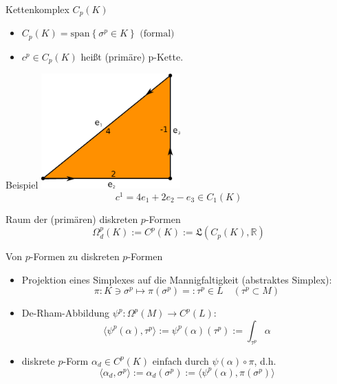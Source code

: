 \documentclass{beamer}
\newcommand{\R}{\mathds{R}}
\begin{document}
  \begin{frame}
    \begin{block}{Kettenkomplex \( C_{p}(K) \)}
      \begin{itemize}
        \item \( C_{p}(K) = \text{span}\left\{ \sigma^{p} \in K \right\} \text{ (formal)}\)
        \item \( c^{p} \in C_{p}(K) \) heißt (primäre) p-Kette.
      \end{itemize}
    \end{block}
    \begin{block}{Beispiel}
      \centering\includegraphics[width=0.4\textwidth]{bilder/inkscape/bspKette.eps}
      \[ c^{1} =  4e_{1} + 2e_{2} - e_{3} \in C_{1}(K) \]
    \end{block}
  \end{frame}

  \begin{frame}
    \begin{block}{Raum der (primären) diskreten \( p \)-Formen }
      \[ \Omega^{p}_{d}(K) := C^{p}(K) := \mathfrak{L}(C_{p}(K), \R) \]
    \end{block}
    \begin{block}{Von \( p \)-Formen zu diskreten \( p \)-Formen}
      \begin{itemize}
        \item Projektion eines Simplexes auf die Mannigfaltigkeit (abstraktes Simplex):
          \[ \pi: K \ni \sigma^{p} \longmapsto \pi(\sigma^{p}) =: \tau^{p} \in L \quad (\tau^{p} \subset M)  \]
        \item De-Rham-Abbildung \( \psi^{p}: \Omega^{p}(M) \rightarrow C^{p}(L)\):
          \[ \langle\psi^{p}(\alpha) , \tau^{p} \rangle := \psi^{p}(\alpha)(\tau^{p}) :=\int_{\tau^{p}} \alpha  \]
        \item diskrete \( p \)-Form \( \alpha_{d} \in C^{p}(K)\) einfach durch \( \psi(\alpha)\circ\pi \), d.h. 
          \[ \langle \alpha_{d} , \sigma^{p} \rangle := \alpha_{d}(\sigma^{p}) := \langle \psi^{p}(\alpha) , \pi(\sigma^{p}) \rangle\]
      \end{itemize}
    \end{block}
  \end{frame}
 
\end{document}
